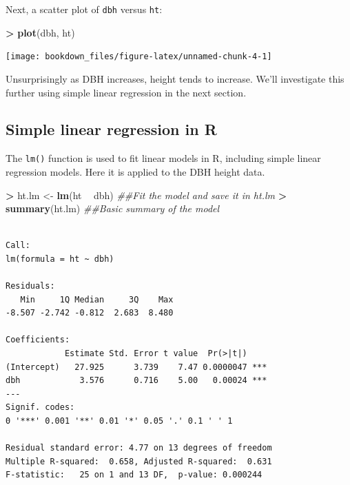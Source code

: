 \documentclass[]{krantz}
\makeatletter
\newenvironment{Shaded}{\begin{snugshade}}{\end{snugshade}}
\newcommand{\CommentTok}[1]{\textcolor[rgb]{0.37,0.37,0.37}{\textit{#1}}}
\newcommand{\KeywordTok}[1]{\textcolor[rgb]{0.27,0.27,0.27}{\textbf{#1}}}
\newcommand{\NormalTok}[1]{#1}
\newcommand{\OperatorTok}[1]{\textcolor[rgb]{0.43,0.43,0.43}{\textbf{#1}}}
\newcommand{\StringTok}[1]{\textcolor[rgb]{0.5,0.5,0.5}{#1}}
\newenvironment{kframe}{%
\medskip{}
\setlength{\fboxsep}{.8em}
 \def\at@end@of@kframe{}%
 \ifinner\ifhmode%
  \def\at@end@of@kframe{\end{minipage}}%
  \begin{minipage}{\columnwidth}%
 \fi\fi%
 \def\FrameCommand##1{\hskip\@totalleftmargin \hskip-\fboxsep
 \colorbox{shadecolor}{##1}\hskip-\fboxsep
     \hskip-\linewidth \hskip-\@totalleftmargin \hskip\columnwidth}%
 \MakeFramed {\advance\hsize-\width
   \@totalleftmargin\z@ \linewidth\hsize
   \@setminipage}}%
 {\par\unskip\endMakeFramed%
 \at@end@of@kframe}
\renewenvironment{Shaded}{\begin{kframe}}{\end{kframe}}
\makeatother
\begin{document}
Next, a scatter plot of \texttt{dbh} versus \texttt{ht}:

\begin{Shaded}
\begin{Highlighting}[]
\OperatorTok{>}\StringTok{ }\KeywordTok{plot}\NormalTok{(dbh, ht)}
\end{Highlighting}
\end{Shaded}

\begin{center}\texttt{[image: bookdown\_files/figure-latex/unnamed-chunk-4-1]} \end{center}

Unsurprisingly as DBH increases, height tends to increase. We'll investigate this further using simple linear regression in the next section.

\hypertarget{simple-linear-regression-in-r}{%
\subsection{Simple linear regression in R}\label{simple-linear-regression-in-r}}

The \texttt{lm()} function is used to fit linear models in R, including simple linear regression models. Here it is applied to the DBH height data.

\begin{Shaded}
\begin{Highlighting}[]
\OperatorTok{>}\StringTok{ }\NormalTok{ht.lm <-}\StringTok{ }\KeywordTok{lm}\NormalTok{(ht }\OperatorTok{~}\StringTok{ }\NormalTok{dbh)  }\CommentTok{##Fit the model and save it in ht.lm}
\OperatorTok{>}\StringTok{ }\KeywordTok{summary}\NormalTok{(ht.lm)  }\CommentTok{##Basic summary of the model}
\end{Highlighting}
\end{Shaded}

\begin{verbatim}

Call:
lm(formula = ht ~ dbh)

Residuals:
   Min     1Q Median     3Q    Max 
-8.507 -2.742 -0.812  2.683  8.480 

Coefficients:
            Estimate Std. Error t value  Pr(>|t|)    
(Intercept)   27.925      3.739    7.47 0.0000047 ***
dbh            3.576      0.716    5.00   0.00024 ***
---
Signif. codes:  
0 '***' 0.001 '**' 0.01 '*' 0.05 '.' 0.1 ' ' 1

Residual standard error: 4.77 on 13 degrees of freedom
Multiple R-squared:  0.658, Adjusted R-squared:  0.631 
F-statistic:   25 on 1 and 13 DF,  p-value: 0.000244
\end{verbatim}
\end{document}
